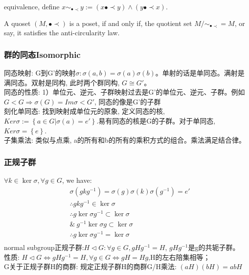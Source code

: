\documentclass[UTF8]{../09-Mathematics}
\begin{document}
\begin{proposition}
  equivalence, define $x\sim _{\bullet \prec } y:= (x \bullet \prec y) \wedge (y \bullet \prec x)$.
\end{proposition}

\begin{proposition}
  A quoset $(M, \bullet \prec)$ is a poset, if and only if, the quotient set $M / \sim _{\bullet \prec} =  M$, or say, it satisfies the anti-circularity law.
\end{proposition}


\subsubsection{群的同态Isomorphic}
同态映射: G到G'的映射$\sigma: \sigma(a,b)=\sigma(a) \sigma(b)$。单射的话是单同态。满射是满同态。双射是同构, 此时两个群同构, $G \cong G'$。\\
同态的性质: 1）单位元、逆元、子群映射过去是G’的单位元、逆元、子群。例如$G<G \Rightarrow \sigma(G)=Im\sigma <G'$, 同态的像是G'的子群\\
刻化单同态: 找到映射成单位元的原象, 定义同态的核, $Ker\sigma:=\left\{ a \in G | \sigma(a)=e' \right\}$.易有同态的核是G的子群。对于单同态, $Ker\sigma=\left\{ e \right\}$.\\
子集乘法: 类似与点乘, a的所有和b的所有的乘积方式的组合。乘法满足结合律。\\

\subsubsection{正规子群}
$ \forall k \in \ker \sigma, \forall g\in G$, we have:
\begin{equation}
\begin{split}
&\sigma(gkg^{-1})=\sigma(g)\sigma(k)\sigma(g^{-1})=e'\\
& \therefore gkg^{-1}\in \ker \sigma\\
& \therefore g \ker \sigma g^{-1} \subset \ker \sigma\\
& \& \ g^{-1}  \ker \sigma g\subset \ker \sigma\\
& \therefore g \ker \sigma g^{-1}=\ker \sigma\\
\end{split}
\end{equation}
normal subgroup正规子群:$H \lhd G :\forall g \in G, gHg^{-1}=H$, $gHg^{-1}$是g的共轭子群。\\
性质: $H \lhd G \Leftrightarrow gHg^{-1}=H,\forall g \in G \Leftrightarrow gH=Hg$,H的左右陪集相等；\\
G关于正规子群H的商群: 规定正规子群H的商群G/H乘法: $(aH)(bH)=abH$\\
\end{document}
